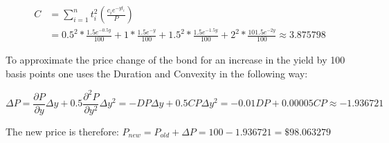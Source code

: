 \documentclass{article}
\begin{document}
\begin{align*}
	C &= \sum_{i=1}^n t_i^2 \left(\frac{c_ie^{-yt_i}}{P}\right) \\
	&= 0.5^2 * \frac{1.5e^{-0.5y}}{100} + 1*\frac{1.5e^{-y}}{100} + 1.5^2 * \frac{1.5e^{-1.5y}}{100} + 2^2 * \frac{101.5e^{-2y}}{100} \approx 3.875798
\end{align*}

To approximate the price change of the bond for an increase in the yield by 100 basis points one uses the Duration and Convexity in the following way:

$$\Delta P = \frac{\partial P}{\partial y} \Delta y + 0.5 \frac{\partial^2 P}{\partial y^2} \Delta y^2 = -DP\Delta y + 0.5 CP \Delta y^2 = -0.01DP + 0.00005CP \approx -1.936721$$

The new price is therefore: $P_{new} = P_{old} + \Delta P = 100 -1.936721 = \$98.063279 $
\end{document}
